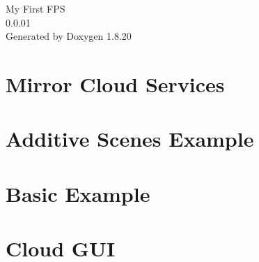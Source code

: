 \let\mypdfximage\pdfximage\def\pdfximage{\immediate\mypdfximage}\documentclass[twoside]{book}
\newcommand{\+}{\discretionary{\mbox{\scriptsize$\hookleftarrow$}}{}{}}
\newcommand{\clearemptydoublepage}{%
  \newpage{\pagestyle{empty}\cleardoublepage}%
}
\begin{document}
\hypersetup{pageanchor=false,
             bookmarksnumbered=true,
             pdfencoding=unicode
            }
\begin{titlepage}
\vspace*{7cm}
\begin{center}%
{\Large My First F\+PS \\[1ex]\large 0.\+0.\+01 }\\
\vspace*{1cm}
{\large Generated by Doxygen 1.8.20}\\
\end{center}
\end{titlepage}
\clearemptydoublepage
{}
\tableofcontents
\clearemptydoublepage
{}
\hypersetup{pageanchor=true}

\chapter{Mirror Cloud Services}
\label{md__c___users_aaron__documents__git_hub__my_f_p_s__assets__mirror__cloud__r_e_a_d_m_e}

\chapter{Additive Scenes Example}
\label{md__c___users_aaron__documents__git_hub__my_f_p_s__assets__mirror__examples__additive_scenes__r_e_a_d_m_e}

\chapter{Basic Example}
\label{md__c___users_aaron__documents__git_hub__my_f_p_s__assets__mirror__examples__basic__r_e_a_d_m_e}

\chapter{Cloud G\+UI}
\label{md__c___users_aaron__documents__git_hub__my_f_p_s__assets__mirror__examples__cloud__g_u_i__r_e_a_d_m_e}

\end{document}
